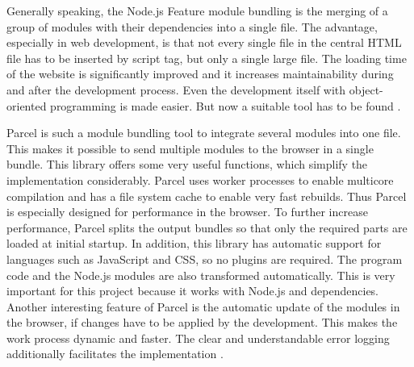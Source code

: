 Generally speaking, the Node.js Feature module bundling is the merging of a group of modules with their dependencies into a single file. The advantage, especially in web development, is that not every single file in the central HTML file has to be inserted by script tag, but only a single large file. The loading time of the website is significantly improved and it increases maintainability during and after the development process. Even the development itself with object-oriented programming is made easier. But now a suitable tool has to be found \cite{Kasireddy2016}. 

Parcel is such a module bundling tool to integrate several modules into one file. This makes it possible to send multiple modules to the browser in a single bundle. This library offers some very useful functions, which simplify the implementation considerably. Parcel uses worker processes to enable multicore compilation and has a file system cache to enable very fast rebuilds. Thus Parcel is especially designed for performance in the browser. To further increase performance, Parcel splits the output bundles so that only the required parts are loaded at initial startup. In addition, this library has automatic support for languages such as JavaScript and CSS, so no plugins are required. The program code and the Node.js modules are also transformed automatically. This is very important for this project because it works with Node.js and dependencies. Another interesting feature of Parcel is the automatic update of the modules in the browser, if changes have to be applied by the development. This makes the work process dynamic and faster. The clear and understandable error logging additionally facilitates the implementation \cite{Govett2019}. 

